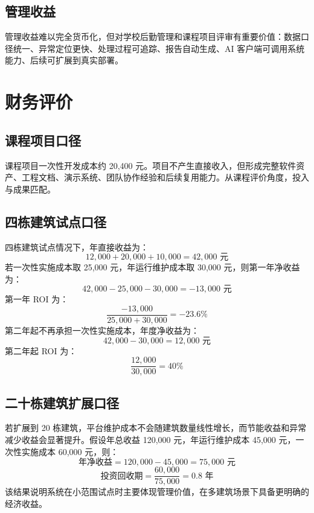 \documentclass[12pt,a4paper]{ctexart}
\begin{document}
\subsection{管理收益}
管理收益难以完全货币化，但对学校后勤管理和课程项目评审有重要价值：数据口径统一、异常定位更快、处理过程可追踪、报告自动生成、AI 客户端可调用系统能力、后续可扩展到真实部署。

\section{财务评价}
\subsection{课程项目口径}
课程项目一次性开发成本约 20,400 元。项目不产生直接收入，但形成完整软件资产、工程文档、演示系统、团队协作经验和后续复用能力。从课程评价角度，投入与成果匹配。

\subsection{四栋建筑试点口径}
四栋建筑试点情况下，年直接收益为：
\[
12,000 + 20,000 + 10,000 = 42,000 \text{ 元}
\]
若一次性实施成本取 25,000 元，年运行维护成本取 30,000 元，则第一年净收益为：
\[
42,000 - 25,000 - 30,000 = -13,000 \text{ 元}
\]
第一年 ROI 为：
\[
\frac{-13,000}{25,000 + 30,000} = -23.6\%
\]
第二年起不再承担一次性实施成本，年度净收益为：
\[
42,000 - 30,000 = 12,000 \text{ 元}
\]
第二年起 ROI 为：
\[
\frac{12,000}{30,000}=40\%
\]

\subsection{二十栋建筑扩展口径}
若扩展到 20 栋建筑，平台维护成本不会随建筑数量线性增长，而节能收益和异常减少收益会显著提升。假设年总收益 120,000 元，年运行维护成本 45,000 元，一次性实施成本 60,000 元，则：
\[
\text{年净收益}=120,000-45,000=75,000 \text{ 元}
\]
\[
\text{投资回收期}=\frac{60,000}{75,000}=0.8 \text{ 年}
\]
该结果说明系统在小范围试点时主要体现管理价值，在多建筑场景下具备更明确的经济收益。
\end{document}
